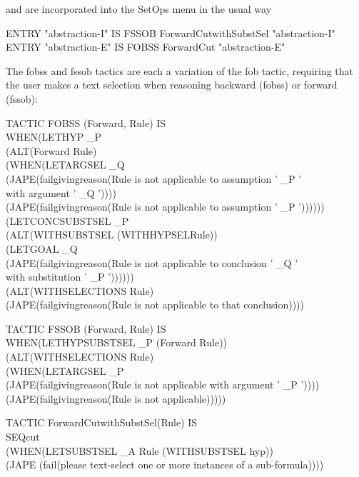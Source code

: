 \documentclass[11pt]{book}
\newcommand{\tab}{\hspace{5mm}}
\begin{document}
and are incorporated into the SetOps menu in the usual way

ENTRY "abstraction-I" IS FSSOB ForwardCutwithSubstSel "abstraction-I"\\
ENTRY "abstraction-E" IS FOBSS ForwardCut "abstraction-E"


The fobss and fssob tactics are each a variation of the fob tactic, requiring that the user makes a text selection when reasoning backward (fobss) or forward (fssob):

TACTIC FOBSS (Forward, Rule) IS \\
\tab WHEN\tab (LETHYP \_P\\
\tab \tab \tab (ALT\tab (Forward Rule)\\
\tab \tab \tab \tab (WHEN\tab (LETARGSEL \_Q \\
\tab \tab \tab \tab \tab \tab (JAPE(failgivingreason(Rule is not applicable to assumption ' \_P ' \\
\tab \tab \tab \tab \tab \tab \tab \tab \tab \tab with argument ' \_Q '))))\\
\tab \tab \tab \tab \tab (JAPE(failgivingreason(Rule is not applicable to assumption ' \_P ')))))) \\
\tab \tab (LETCONCSUBSTSEL \_P \\
\tab \tab \tab (ALT\tab (WITHSUBSTSEL (WITHHYPSELRule))\\
\tab \tab \tab \tab (LETGOAL \_Q\\
\tab \tab \tab \tab \tab (JAPE(failgivingreason(Rule is not applicable to conclusion ' \_Q '\\
\tab \tab \tab \tab \tab \tab \tab \tab \tab \tab with substitution ' \_P '))))))\\
\tab \tab (ALT\tab (WITHSELECTIONS Rule)\\
\tab \tab \tab (JAPE(failgivingreason(Rule is not applicable to that conclusion))))

TACTIC FSSOB (Forward, Rule) IS \\
\tab WHEN\tab (LETHYPSUBSTSEL \_P (Forward Rule)) \\
\tab \tab (ALT\tab (WITHSELECTIONS Rule)\\
\tab \tab \tab (WHEN\tab (LETARGSEL \_P\\
\tab \tab \tab \tab \tab (JAPE(failgivingreason(Rule is not applicable with argument ' \_P '))))\\
\tab \tab \tab \tab (JAPE(failgivingreason(Rule is not applicable)))))

TACTIC ForwardCutwithSubstSel(Rule) IS\\
\tab SEQ\tab cut \\
\tab \tab (WHEN\tab (LETSUBSTSEL \_A Rule (WITHSUBSTSEL hyp))\\
\tab \tab \tab \tab (JAPE (fail(please text-select one or more instances of a sub-formula))))
\end{document}
